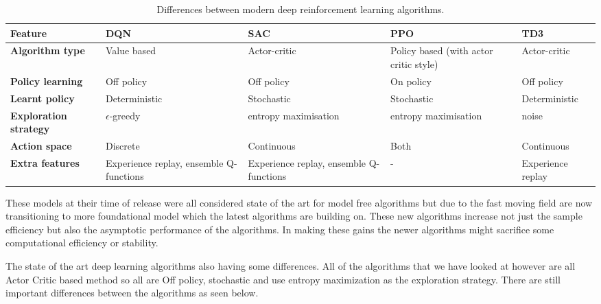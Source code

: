 \begin{table}[h]
    \footnotesize
    \centering
    \renewcommand{\arraystretch}{1.4} %
    \begin{tabularx}{\textwidth}{p{1.3cm} X X X X}
        \hline
        \textbf{Feature} & \textbf{DQN} & \textbf{SAC} & \textbf{PPO} & \textbf{TD3} \\
        \hline
        \textbf{Algorithm type}       & Value based      & Actor-critic         & Policy based (with actor critic style)              & Actor-critic  \\
        \textbf{Policy learning}      & Off policy        & Off policy           & On policy            & Off policy    \\
        \textbf{Learnt policy}        & Deterministic     & Stochastic           & Stochastic           & Deterministic \\
        \textbf{Exploration strategy} & $\epsilon$-greedy & entropy maximisation & entropy maximisation & noise         \\
        \textbf{Action space}         & Discrete          & Continuous           & Both                 & Continuous    \\
        \textbf{Extra features} & Experience replay, ensemble Q-functions & Experience replay, ensemble Q-functions & - & Experience replay \\
        \hline
    \end{tabularx}
    \caption{Differences between modern deep reinforcement learning algorithms.}
\end{table}

These models at their time of release were all considered state of the art for model free algorithms but due to the fast moving field are now transitioning to more foundational model which the latest algorithms are building on. These new algorithms increase not just the sample efficiency but also the asymptotic performance of the algorithms. In making these gains the newer algorithms might sacrifice some computational efficiency or stability.

The state of the art deep learning algorithms also having some differences. All of the algorithms that we have looked at however are all Actor Critic based method so all are Off policy, stochastic and use entropy maximization as the exploration strategy. There are still important differences between the algorithms as seen below.

